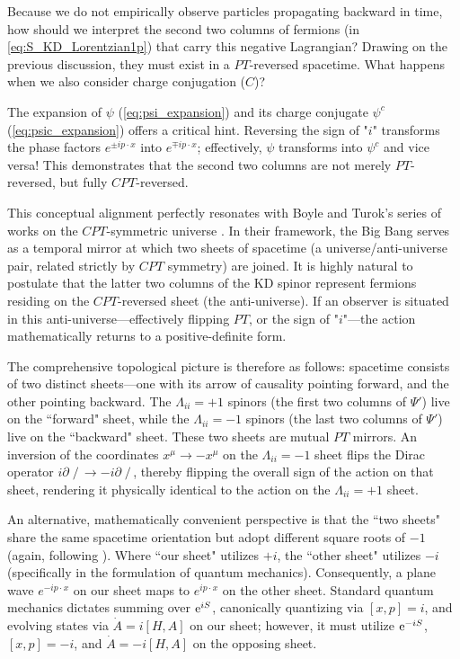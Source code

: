 Because we do not empirically observe particles propagating backward in time, how should we interpret the second two columns of fermions (in \cref{eq:S_KD_Lorentzian1p}) that carry this negative Lagrangian? Drawing on the previous discussion, they must exist in a $PT$-reversed spacetime. What happens when we also consider charge conjugation ($C$)? 

The expansion of $\psi$ (\cref{eq:psi_expansion}) and its charge conjugate $\psi^c$ (\cref{eq:psic_expansion}) offers a critical hint. Reversing the sign of "$i$" transforms the phase factors $e^{\pm ip \cdot x}$ into $e^{\mp ip\cdot x}$; effectively, $\psi$ transforms into $\psi^c$ and vice versa! This demonstrates that the second two columns are not merely $PT$-reversed, but fully $CPT$-reversed. 

This conceptual alignment perfectly resonates with Boyle and Turok's series of works on the $CPT$-symmetric universe \cite{Boyle:2018tzc, Boyle:2018rgh, Boyle:2021jej, Turok:2022fgq, Boyle:2022lcq}. In their framework, the Big Bang serves as a temporal mirror at which two sheets of spacetime (a universe/anti-universe pair, related strictly by $CPT$ symmetry) are joined. It is highly natural to postulate that the latter two columns of the KD spinor represent fermions residing on the $CPT$-reversed sheet (the anti-universe). If an observer is situated in this anti-universe—effectively flipping $PT$, or the sign of "$i$"—the action mathematically returns to a positive-definite form.

The comprehensive topological picture is therefore as follows: spacetime consists of two distinct sheets—one with its arrow of causality pointing forward, and the other pointing backward. The $\Lambda_{ii}=+1$ spinors (the first two columns of $\Psi'$) live on the ``forward" sheet, while the $\Lambda_{ii}=-1$ spinors (the last two columns of $\Psi'$) live on the ``backward" sheet. These two sheets are mutual $PT$ mirrors. An inversion of the coordinates $x^{\mu}\to-x^{\mu}$ on the $\Lambda_{ii}=-1$ sheet flips the Dirac operator $i\partial\!\!\!\!\;\!/\,\to-i\partial\!\!\!\!\;\!/\,$, thereby flipping the overall sign of the action on that sheet, rendering it physically identical to the action on the $\Lambda_{ii}=+1$ sheet.

An alternative, mathematically convenient perspective is that the ``two sheets" share the same spacetime orientation but adopt different square roots of $-1$ (again, following \cite{Donoghue:2019ecz}). Where ``our sheet" utilizes $+i$, the ``other sheet" utilizes $-i$ (specifically in the formulation of quantum mechanics). Consequently, a plane wave $e^{-ip\cdot x}$ on our sheet maps to $e^{ip\cdot x}$ on the other sheet. Standard quantum mechanics dictates summing over ${\rm e}^{iS}$, canonically quantizing via $[x,p]=i$, and evolving states via $\dot{A}=i[H,A]$ on our sheet; however, it must utilize ${\rm e}^{-iS}$, $[x,p]=-i$, and $\dot{A}=-i[H,A]$ on the opposing sheet.

